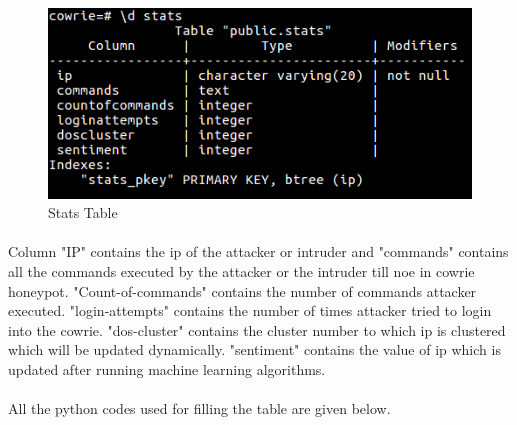 \documentclass{article}
\begin{document}
\begin{figure}[H]
\centering
\caption{Stats Table}
\includegraphics[scale=0.7]{Stats}
\end{figure}
 
\paragraph{}
Column "IP" contains the ip of the attacker or intruder and "commands" contains all the commands executed by the attacker or the intruder till noe in cowrie honeypot. "Count-of-commands" contains the number of commands attacker executed. "login-attempts" contains the number of times attacker tried to login into the cowrie. "dos-cluster" contains the cluster number to which ip is clustered which will be updated dynamically. "sentiment" contains the value of ip which is updated after running machine learning algorithms.

\paragraph{}
All the python codes used for filling the table are given below.
\end{document}
